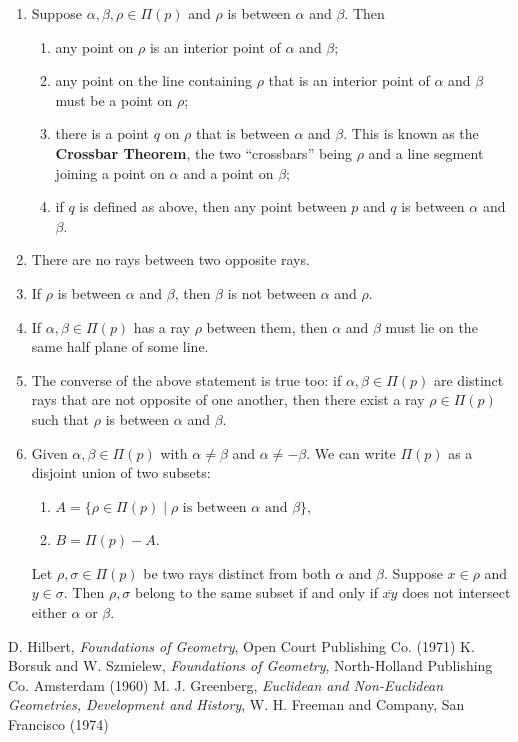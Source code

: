 \documentclass[12pt]{article}
\begin{document}
\begin{enumerate}
\item Suppose $\alpha,\beta,\rho\in\Pi(p)$ and $\rho$ is between
$\alpha$ and $\beta$.  Then
\begin{enumerate}
\item any point on $\rho$ is an interior point of $\alpha$ and
$\beta$;
\item any point on the line containing $\rho$ that is an interior
point of $\alpha$ and $\beta$ must be a point on $\rho$;
\item there is a point $q$ on $\rho$ that is between $\alpha$ and
$\beta$.  This is known as the \textbf{Crossbar Theorem}, the two ``crossbars'' being $\rho$ and a line segment joining a point on $\alpha$ and a point on $\beta$;
\item if $q$ is defined as above, then any point between $p$ and
$q$ is between $\alpha$ and $\beta$.
\end{enumerate}
\item There are no rays between two opposite rays.
\item If $\rho$ is between $\alpha$ and $\beta$, then $\beta$ is not
between $\alpha$ and $\rho$.
\item If $\alpha,\beta\in\Pi(p)$ has a ray $\rho$ between them, then
$\alpha$ and $\beta$ must lie on the same half plane of some line.
\item The converse of the above statement is true too: if
$\alpha,\beta\in\Pi(p)$ are distinct rays that are not opposite of
one another, then there exist a ray $\rho\in\Pi(p)$ such that $\rho$
is between $\alpha$ and $\beta$.
\item Given $\alpha,\beta\in\Pi(p)$ with $\alpha\neq\beta$ and
$\alpha\neq-\beta$.  We can write $\Pi(p)$ as a disjoint union of
two subsets:
\begin{enumerate}
\item $A =\lbrace \rho\in\Pi(p)\mid
\rho\mbox{ is between }\alpha\mbox{ and }\beta\rbrace$,
\item $B=\Pi(p)-A$.
\end{enumerate}
Let $\rho,\sigma\in\Pi(p)$ be two rays distinct from both $\alpha$
and $\beta$.  Suppose $x\in\rho$ and $y\in\sigma$.  Then
$\rho,\sigma$ belong to the same subset if and only if
$\overline{xy}$ does not intersect either $\alpha$ or $\beta$.
\end{enumerate}

\begin{thebibliography}{6}
 D. Hilbert, {\it Foundations of Geometry}, Open Court Publishing Co. (1971)
 K. Borsuk and W. Szmielew, {\it Foundations of Geometry}, North-Holland Publishing Co. Amsterdam (1960)
 M. J. Greenberg, {\it Euclidean and Non-Euclidean Geometries, Development and History}, W. H. Freeman and Company, San Francisco (1974)
\end{thebibliography}
\end{document}
